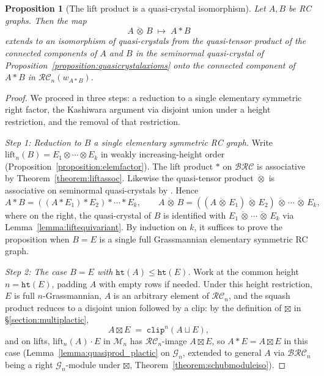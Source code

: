 \documentclass{amsart}
\newtheorem{proposition}[lemma]{Proposition}
\theoremstyle{definition}
\theoremstyle{remark}
\numberwithin{equation}{subsection}
\newcommand{\wof}[1]{w_{#1}}
\newcommand{\grass}{\mathcal{G}}
\newcommand{\hr}{\mathtt{ht}}
\newcommand{\clp}{\mathtt{clip}}
\newcommand{\BRC}{\mathcal{BRC}}
\newcommand{\RC}{\mathcal{RC}}
\begin{document}
\begin{proposition}[The lift product is a quasi-crystal isomorphism]\label{proposition:quasiprod}
Let $A,B$ be RC graphs. Then the map
$$A\,\ddot{\otimes}\,B\;\longmapsto\;A*B$$
extends to an isomorphism of quasi-crystals from the quasi-tensor product of the connected components of $A$ and $B$ in the seminormal quasi-crystal of Proposition~\ref{proposition:quasicrystalaxioms} onto the connected component of $A*B$ in $\RC_n(\wof{A*B})$. 
\end{proposition}
\begin{proof}
We proceed in three steps: a reduction to a single elementary symmetric right factor, the Kashiwara argument via disjoint union under a height restriction, and the removal of that restriction.

\smallskip\noindent\emph{Step 1: Reduction to $B$ a single elementary symmetric RC graph.}
Write $\mathrm{lift}_n(B) = E_1\otimes\cdots\otimes E_k$ in weakly increasing-height order (Proposition~\ref{proposition:elemfactor}). The lift product $*$ on $\BRC$ is associative by Theorem~\ref{theorem:liftassoc}. Likewise the quasi-tensor product $\ddot\otimes$ is associative on seminormal quasi-crystals by \cite[Theorem~5.1]{cain2023quasicrystals}. Hence
$$A*B = ((A*E_1)*E_2)*\cdots*E_k,\qquad A\,\ddot\otimes\, B = ((A\,\ddot\otimes\, E_1)\,\ddot\otimes\, E_2)\,\ddot\otimes\,\cdots\,\ddot\otimes\, E_k,$$
where on the right, the quasi-crystal of $B$ is identified with $E_1\,\ddot\otimes\,\cdots\,\ddot\otimes\, E_k$ via Lemma~\ref{lemma:liftequivariant}. By induction on $k$, it suffices to prove the proposition when $B = E$ is a single full Grassmannian elementary symmetric RC graph.

\smallskip\noindent\emph{Step 2: The case $B = E$ with $\hr(A) \le \hr(E)$.}
Work at the common height $n = \hr(E)$, padding $A$ with empty rows if needed. Under this height restriction, $E$ is full $n$-Grassmannian, $A$ is an arbitrary element of $\RC_n$, and the squash product reduces to a disjoint union followed by a clip: by the definition of $\boxtimes$ in \S\ref{section:multiplactic},
$$A\boxtimes E \;=\; \clp^{n}(A\sqcup E),$$
and on lifts, $\mathrm{lift}_n(A)\cdot E$ in $\mathcal{M}_n$ has $\RC_n$-image $A\boxtimes E$, so $A*E = A\boxtimes E$ in this case (Lemma~\ref{lemma:quasiprod_plactic} on $\grass_n$, extended to general $A$ via $\BRC_n$ being a right $\grass_n$-module under $\boxtimes$, Theorem~\ref{theorem:schubmoduleiso}).


\end{proof}
\end{document}
